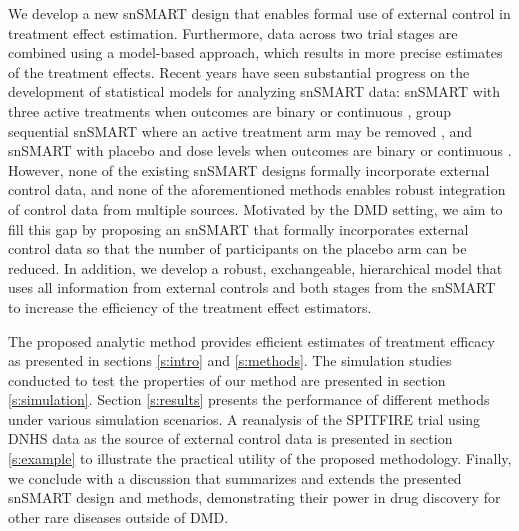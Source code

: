 We develop a new \ac{snSMART} design that enables formal use of external control in treatment effect estimation. Furthermore, data across two trial stages are combined using a model-based approach, which results in more precise estimates of the treatment effects. Recent years have seen substantial progress on the development of statistical models for analyzing \ac{snSMART} data: \ac{snSMART} with three active treatments when outcomes are binary \citep{wei2018bayesian, wei2020sample, chao2020dynamic} or continuous \citep{hartman2021design}, group sequential \ac{snSMART} where an active treatment arm may be removed \citep{chao2020bayesian}, and \ac{snSMART} with placebo and dose levels when outcomes are binary \citep{fang2021bayesian} or continuous \citep{fang2022comparing}. However, none of the existing \ac{snSMART} designs formally incorporate external control data, and none of the aforementioned methods enables robust integration of control data from multiple sources. Motivated by the \ac{DMD} setting, we aim to fill this gap by proposing an \ac{snSMART} that formally incorporates external control data so that the number of participants on the placebo arm can be reduced. In addition, we develop a robust, exchangeable, hierarchical model that uses all information from external controls and both stages from the \ac{snSMART} to increase the efficiency of the treatment effect estimators.

The proposed analytic method provides efficient estimates of treatment efficacy as presented in sections \ref{s:intro} and \ref{s:methods}. The simulation studies conducted to test the properties of our method are presented in section \ref{s:simulation}. Section \ref{s:results} presents the performance of different methods under various simulation scenarios. A reanalysis of the SPITFIRE trial using \ac{DNHS} data as the source of external control data is presented in section \ref{s:example} to illustrate the practical utility of the proposed methodology. Finally, we conclude with a discussion that summarizes and extends the presented \ac{snSMART} design and methods, demonstrating their power in drug discovery for other rare diseases outside of \ac{DMD}.


